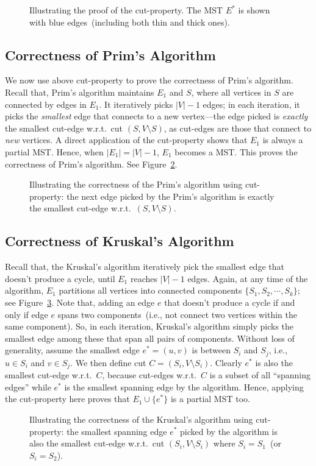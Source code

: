 \documentclass[letterpaper,11pt]{article}
\theoremstyle{mytheorem}
\begin{document}
\begin{figure}[h]
\centering{}
\caption{Illustrating the proof of the cut-property. The MST $E^*$ is shown with blue edges~(including both thin and thick ones).}
\label{fig:proof}
\end{figure}

\subsection*{Correctness of Prim's Algorithm}


We now use above cut-property to prove the correctness of Prim's algorithm.
Recall that, Prim's algorithm maintains $E_1$ and $S$, where all vertices in $S$ are connected by edges in $E_1$.
It iteratively picks $|V|-1$ edges;
in each iteration, it picks the \emph{smallest} edge that connects to a new vertex---the edge picked
is \emph{exactly} the smallest cut-edge w.r.t.\ cut $(S,V\setminus S)$,
as cut-edges are those that connect to \emph{new} vertices.
A direct application of the cut-property shows that $E_1$ is always a partial MST.
Hence, when $|E_1| = |V|-1$, $E_1$ becomes a MST.
This proves the correctness of Prim's algorithm.
See Figure~\ref{fig:prim}.

\begin{figure}[h]
\centering{}
\caption{Illustrating the correctness of the Prim's algorithm using cut-property:
the next edge picked by the Prim's algorithm is exactly the smallest cut-edge w.r.t.\ $(S,V\setminus S)$.}
\label{fig:prim}
\end{figure}


\subsection*{Correctness of Kruskal's Algorithm}

Recall that, the Kruskal's algorithm iteratively pick the smallest edge that doesn't produce a cycle,
until $E_1$ reaches $|V| - 1$ edges. Again, at any time of the algorithm,
$E_1$ partitions all vertices into connected components $\{S_1, S_2, \cdots, S_k\}$; see Figure~\ref{fig:kruskal}.
Note that, adding an edge $e$ that doesn't produce a cycle if and only if edge $e$ spans two components~(i.e., not connect two vertices within the same component).
So, in each iteration, Kruskal's algorithm simply picks the smallest edge among these that span all pairs of
components. Without loss of generality, assume the smallest edge $e^* = (u,v)$ is between $S_i$ and $S_j$, i.e., $u\in S_i$ and $v\in S_j$.
We then define cut $C = (S_i, V\setminus S_i)$. Clearly $e^*$ is also the smallest cut-edge w.r.t.\ $C$,
because cut-edges w.r.t.\ $C$ is a subset of all ``spanning edges'' while $e^*$ is the smallest spanning edge by the algorithm.
Hence, applying the cut-property here proves that $E_1\cup \{e^*\}$ 
is a partial MST too.

\begin{figure}[h]
\centering{}
\caption{Illustrating the correctness of the Kruskal's algorithm using cut-property:
the smallest spanning edge $e^*$ picked by the algorithm is also the smallest cut-edge
	w.r.t.\ cut $(S_i,V\setminus S_i)$ where $S_i = S_1$~(or $S_i = S_2$).  }
\label{fig:kruskal}
\end{figure}
\end{document}
